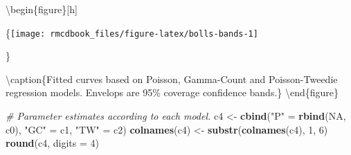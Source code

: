 \documentclass[9pt,a5paper,]{book}
\newenvironment{Shaded}{}{}
\newcommand{\KeywordTok}[1]{\textbf{{#1}}}
\newcommand{\DataTypeTok}[1]{\underline{{#1}}}
\newcommand{\DecValTok}[1]{{#1}}
\newcommand{\StringTok}[1]{{#1}}
\newcommand{\CommentTok}[1]{\textit{{#1}}}
\newcommand{\OtherTok}[1]{{#1}}
\newcommand{\NormalTok}[1]{{#1}}
\renewenvironment{Shaded}{\color{inputcolor}}{}
\renewcommand{\DataTypeTok}[1]{{#1}}
\theoremstyle{definition}
\theoremstyle{definition}
\theoremstyle{remark}
\begin{document}
\textbackslash{}begin\{figure\}{[}h{]}

\{\centering \texttt{[image: rmcdbook\_files/figure-latex/bolls-bands-1]}

\}

\textbackslash{}caption\{Fitted curves based on Poisson, Gamma-Count and
Poisson-Tweedie regression models. Envelops are 95\% coverage confidence
bands.\}\label{fig:bolls-bands} \textbackslash{}end\{figure\}

\begin{Shaded}
\end{Shaded}

\begin{Shaded}
\begin{Highlighting}[]
\CommentTok{# Parameter estimates according to each model.}
\NormalTok{c4 <-}\StringTok{ }\KeywordTok{cbind}\NormalTok{(}\StringTok{"P"} \NormalTok{=}\StringTok{ }\KeywordTok{rbind}\NormalTok{(}\OtherTok{NA}\NormalTok{, c0),}
            \StringTok{"GC"} \NormalTok{=}\StringTok{ }\NormalTok{c1,}
            \StringTok{"TW"} \NormalTok{=}\StringTok{ }\NormalTok{c2)}
\KeywordTok{colnames}\NormalTok{(c4) <-}\StringTok{ }\KeywordTok{substr}\NormalTok{(}\KeywordTok{colnames}\NormalTok{(c4), }\DecValTok{1}\NormalTok{, }\DecValTok{6}\NormalTok{)}
\KeywordTok{round}\NormalTok{(c4, }\DataTypeTok{digits =} \DecValTok{4}\NormalTok{)}
\end{Highlighting}
\end{Shaded}
\end{document}
